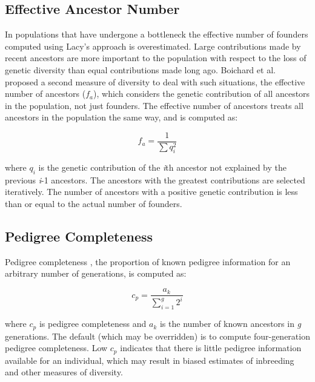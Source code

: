 \subsection{Effective Ancestor Number}
\label{sec:methodology-computation-effective-ancestor-number}
In populations that have undergone a bottleneck the effective number of founders computed using Lacy's \citeyear{ref640} approach is overestimated. Large contributions made by recent ancestors are more important to the population with respect to the loss of genetic diversity than equal contributions made long ago. Boichard et al. \citeyear{ref352} proposed a second measure of diversity to deal with such situations, the effective number of ancestors ($f_a$), which considers the genetic contribution of all ancestors in the population, not just founders. The effective number of ancestors treats all ancestors in the population the same way, and is computed as:

\[f_a = \dfrac{1}{\sum{q_i^2}}\]

where $q_i$ is the genetic contribution of the \textit{i}th ancestor not explained by the previous \textit{i}-1 ancestors.
The ancestors with the greatest contributions are selected iteratively.  The number of ancestors with a positive genetic
contribution is less than or equal to the actual number of founders.
\subsection{Pedigree Completeness}
\label{sec:methodology-pedigre-completeness}
Pedigree completeness \cite{Cassell2003a}, the proportion of known pedigree information for an arbitrary number of generations, is computed as:

\[ c_p = \dfrac{a_k}{\sum_{i=1}^g{2^i}} \]

where $c_p$ is pedigree completeness and $a_k$ is the number of known ancestors in \textit{g} generations.  The default (which may be overridden) is to compute four-generation pedigree completeness.  Low $c_p$ indicates that there is little pedigree information available for an individual, which may result in biased estimates of inbreeding and other measures of diversity.